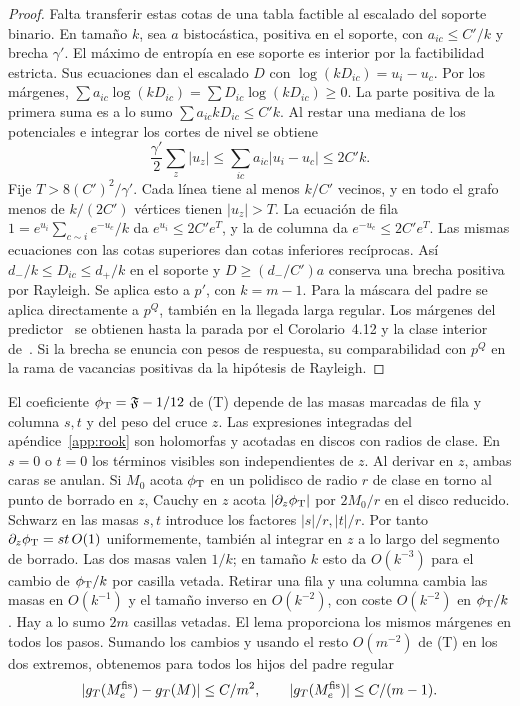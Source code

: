 \begin{proof}
Falta transferir estas cotas de una tabla factible al escalado del soporte binario.
En tamaño \(k\), sea \(a\) bistocástica, positiva en el soporte, con \(a_{ic}\le C'/k\)
y brecha \(\gamma'\). El máximo de entropía en ese soporte es interior por la factibilidad
estricta. Sus ecuaciones dan el escalado \(D\) con \(\log(kD_{ic})=u_i-u_c\).
Por los márgenes, \(\sum a_{ic}\log(kD_{ic})=\sum D_{ic}\log(kD_{ic})\ge0\).
La parte positiva de la primera suma es a lo sumo \(\sum a_{ic}kD_{ic}\le C'k\).
Al restar una mediana de los potenciales e integrar los cortes de nivel se obtiene
\[
 \frac{\gamma'}2\sum_z|u_z|\le\sum_{ic}a_{ic}|u_i-u_c|\le2C'k .
\]
Fije \(T>8(C')^2/\gamma'\). Cada línea tiene al menos \(k/C'\) vecinos, y en todo el grafo
menos de \(k/(2C')\) vértices tienen \(|u_z|>T\). La ecuación de fila
\(1=e^{u_i}\sum_{c\sim i} e^{-u_c}/k\) da \(e^{u_i}\le2C'e^T\), y la de columna da
\(e^{-u_c}\le2C'e^T\). Las mismas ecuaciones con las cotas superiores dan cotas inferiores
recíprocas. Así \(d_-/k\le D_{ic}\le d_+/k\) en el soporte y
\(D\ge(d_-/C')a\) conserva una brecha positiva por Rayleigh.
Se aplica esto a \(p'\), con \(k=m-1\). Para la máscara del padre se aplica directamente a
\(p^Q\), también en la llegada larga regular. Los márgenes del predictor~\cite{pc} se obtienen
hasta la parada por el Corolario~4.12 y la clase interior de~\cite[def.~2.2 y §§4--5]{tc}.
Si la brecha se enuncia con pesos de respuesta, su comparabilidad con \(p^Q\) en la rama
de vacancias positivas da la hipótesis de Rayleigh.
\end{proof}

El coeficiente \(\phi_{\mathrm T}=\mathfrak F-1/12\) de (T) depende de las masas marcadas de fila y
columna \(s,t\) y del peso del cruce \(z\). Las expresiones integradas del
apéndice~\ref{app:rook} son holomorfas y acotadas en discos con radios de clase.
En \(s=0\) o \(t=0\) los términos visibles son independientes de \(z\).
Al derivar en \(z\), ambas caras se anulan. Si \(M_0\) acota \(\phi_{\mathrm T}\) en un
polidisco de radio \(r\) de clase en torno al punto de borrado en \(z\), Cauchy en
\(z\) acota \(|\partial_z\phi_{\mathrm T}|\) por \(2M_0/r\) en el disco reducido. Schwarz en las
masas \(s,t\) introduce los factores \(|s|/r,|t|/r\). Por tanto
\(\partial_z\phi_{\mathrm T}=st\,O(1)\) uniformemente, también al integrar en \(z\) a lo largo
del segmento de borrado. Las dos masas valen \(1/k\); en tamaño \(k\) esto da
\(O(k^{-3})\) para el cambio de \(\phi_{\mathrm T}/k\) por casilla vetada. Retirar una fila y una columna
cambia las masas en \(O(k^{-1})\) y el tamaño inverso en \(O(k^{-2})\), con coste
\(O(k^{-2})\) en \(\phi_{\mathrm T}/k\). Hay a lo sumo \(2m\) casillas vetadas. El lema proporciona
los mismos márgenes en todos los pasos. Sumando los cambios y usando el resto \(O(m^{-2})\)
de (T) en los dos extremos, obtenemos para todos los hijos del padre regular
\begin{equation}\label{eq:incremento-hijo-fisico}
 |g_T(M_e^{\rm fis})-g_T(M)|\le C/m^2,\qquad |g_T(M_e^{\rm fis})|\le C/(m-1).
\end{equation}
